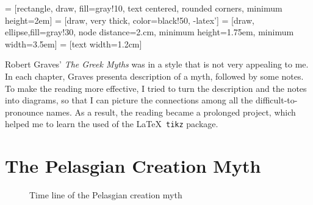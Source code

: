 \documentclass{article}
\begin{document}
\raggedright

 = [rectangle, draw, fill=gray!10,
 text centered, rounded corners, minimum height=2em]
 = [draw, very thick, color=black!50, -latex']
 = [draw, ellipse,fill=gray!30, node distance=2.cm,
    minimum height=1.75em, minimum width=3.5em]
 = [text width=1.2cm]

Robert Graves' \textit{The Greek Myths} was in a style that is not
very appealing to me. In each chapter, Graves presenta description of
a myth, followed by some notes.  To make the reading more effective, I
tried to turn the description and the notes into diagrams, so that I
can picture the connections among all the difficult-to-pronounce
names. As a result, the reading became a prolonged project, which
helped me to learn the used of the \LaTeX\ \texttt{tikz} package.

\section{The Pelasgian Creation Myth} 

\begin{figure}[htb]
\begin{center}
  \resizebox{0.95\textwidth}{!}{

} \end{center}
\caption{Time line of the Pelasgian creation myth}
\label{fig:dagsEX2}
\end{figure}
\end{document}
